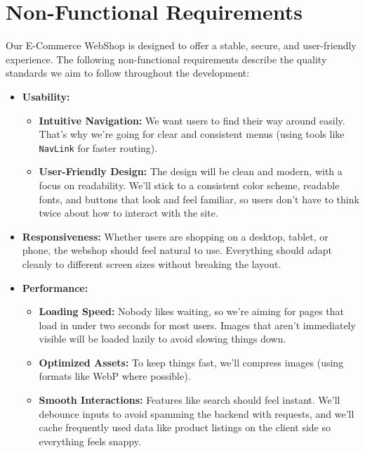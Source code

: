 \documentclass[a4paper,12pt]{article}
\begin{document}
	\section{Non-Functional Requirements}  

Our E-Commerce WebShop is designed to offer a stable, secure, and user-friendly experience. The following non-functional requirements describe the quality standards we aim to follow throughout the development:

\begin{itemize}
    \item \textbf{Usability:}  
    \begin{itemize}
        \item \textbf{Intuitive Navigation:}  
        We want users to find their way around easily. That’s why we’re going for clear and consistent menus (using tools like \texttt{NavLink} for faster routing).

        \item \textbf{User-Friendly Design:}  
        The design will be clean and modern, with a focus on readability. We’ll stick to a consistent color scheme, readable fonts, and buttons that look and feel familiar, so users don’t have to think twice about how to interact with the site.
    \end{itemize}

    \item \textbf{Responsiveness:}  
    Whether users are shopping on a desktop, tablet, or phone, the webshop should feel natural to use. Everything should adapt cleanly to different screen sizes without breaking the layout.

    \item \textbf{Performance:}  
    \begin{itemize}
        \item \textbf{Loading Speed:}  
        Nobody likes waiting, so we’re aiming for pages that load in under two seconds for most users. Images that aren’t immediately visible will be loaded lazily to avoid slowing things down.

        \item \textbf{Optimized Assets:}  
        To keep things fast, we’ll compress images (using formats like WebP where possible).

        \item \textbf{Smooth Interactions:}  
        Features like search should feel instant. We'll debounce inputs to avoid spamming the backend with requests, and we’ll cache frequently used data like product listings on the client side so everything feels snappy.
    \end{itemize}


\end{itemize}
\end{document}
